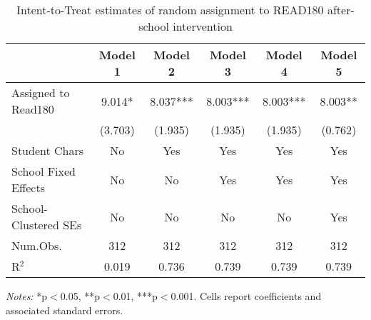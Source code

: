 \begin{table}

\caption{Intent-to-Treat estimates of random assignment to READ180 after-school intervention \label{tab:itt}}
\centering
\begin{threeparttable}
\begin{tabular}[!htbp]{lccccc}
\toprule
  & Model 1 & Model 2 & Model 3 & Model 4 & Model 5\\
\midrule
Assigned to Read180 & 9.014* & 8.037*** & 8.003*** & 8.003*** & 8.003**\\
 & (3.703) & (1.935) & (1.935) & (1.935) & (0.762)\\
\midrule
Student Chars & No & Yes & Yes & Yes & Yes\\
School Fixed Effects & No & No & Yes & Yes & Yes\\
School-Clustered SEs & No & No & No & No & Yes\\
\midrule
Num.Obs. & 312 & 312 & 312 & 312 & 312\\
R$^{2}$ & 0.019 & 0.736 & 0.739 & 0.739 & 0.739 \\ 
\bottomrule
\end{tabular}
\begin{tablenotes}
\item \textit{Notes:} *p$<$0.05, **p$<$0.01, ***p$<$0.001. Cells report coefficients and associated standard errors.
\end{tablenotes}
\end{threeparttable}
\end{table}
